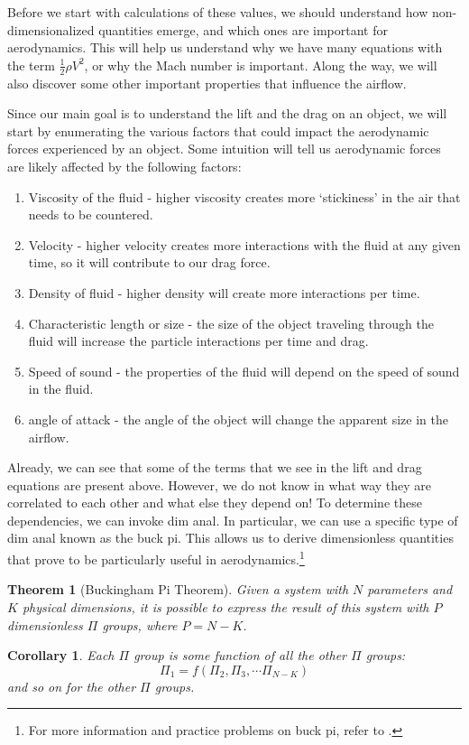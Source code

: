 \documentclass[10pt, openany, titlepage]{book}
\newtheorem{theorem}{Theorem}
\newtheorem{corollary}{Corollary}[theorem]
\theoremstyle{definition}
\begin{document}
Before we start with calculations of these values, we should  understand how non-dimensionalized quantities emerge, and which ones are important for aerodynamics. This will help us understand why we have many equations with the term $\frac{1}{2}\rho V^2$, or why the Mach number is important. Along the way, we will also discover some other important properties that influence the airflow. 

Since our main goal is to understand the lift and the drag on an object, we will start by enumerating the various factors that could impact the aerodynamic forces experienced by an object. Some intuition will tell us aerodynamic forces are likely affected by the following factors:
\begin{enumerate}
    \item Viscosity of the fluid - higher viscosity creates more `stickiness' in the air that needs to be countered.
    \item Velocity - higher velocity creates more interactions with the fluid at any given time, so it will contribute to our drag force.
    \item Density of fluid - higher density will create more interactions per time.
    \item Characteristic length or size - the size of the object traveling through the fluid will increase the particle interactions per time and drag.
    \item Speed of sound - the properties of the fluid will depend on the speed of sound in the fluid.
    \item \Gls{angle of attack} - the angle of the object will change the apparent size in the airflow.
\end{enumerate}
Already, we can see that some of the terms that we see in the lift and drag equations are present above. However, we do not know in what way they are correlated to each other and what else they depend on! To determine these dependencies, we can invoke \gls{dim anal}. In particular, we can use a specific type of \gls{dim anal} known as the \gls{buck pi}. This allows us to derive dimensionless quantities that prove to be particularly useful in aerodynamics.\footnote{For more information and practice problems on \gls{buck pi}, refer to 
\cite{wassgren_buckingham_nodate}.}

\begin{theorem}[Buckingham Pi Theorem]

Given a system with $N$ parameters and $K$ physical dimensions, it is possible to express the result of this system with $P$ dimensionless $\Pi$ groups, where $P=N-K$.
\end{theorem}
\begin{corollary}\label{thm: buck pi corollary}
Each $\Pi$ group is some function of all the other $\Pi$ groups:
$$\Pi_1=f\left(\Pi_2, \Pi_3,\cdots \Pi_{N-K}\right)$$
and so on for the other $\Pi$ groups.
\end{corollary}
\end{document}
